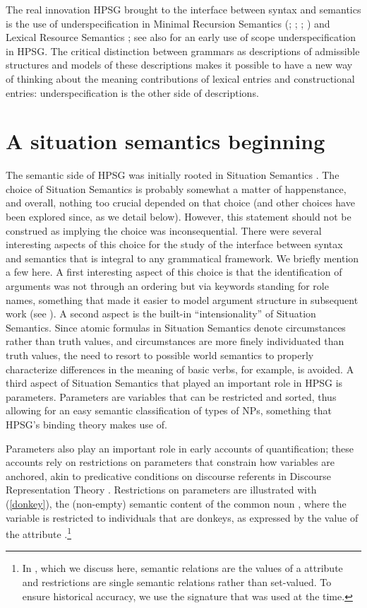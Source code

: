 \documentclass[output=paper
	        ,collection
	        ,collectionchapter
 	        ,biblatex
                ,babelshorthands
                ,newtxmath
                ,draftmode
                ,colorlinks, citecolor=brown
]{langscibook}
\begin{document}
The real innovation HPSG brought to the interface between syntax and semantics is the use of underspecification in Minimal Recursion Semantics (\citealt*{Copestakeetal1995}; \citealt{Egg1998}; \citealt*{Copestakeetal2001}; \citealt*{Copestakeetal2005}) and Lexical Resource Semantics \citep{RichterandSailer2001}; see also \citet{Nerbonne1993a} for an early use of scope underspecification in HPSG. The critical distinction between grammars as descriptions of admissible structures and models of these descriptions makes it possible to have a new way of thinking about the meaning contributions of lexical entries and constructional entries: underspecification is the other side of descriptions. 

\section{A situation semantics beginning}

The semantic side of HPSG was initially rooted in Situation Semantics \citep[Chapter 4]{PollardandSag1987}. The choice of Situation Semantics is probably somewhat a matter of happenstance, and overall, nothing too crucial depended on that choice (and other choices have been explored since, as we detail below). However, this statement should not be construed as implying the choice was inconsequential. There were several interesting aspects of this choice for the study of the interface between syntax and semantics that is integral to any grammatical framework. We briefly mention a few here. A first interesting aspect of this choice is that the identification of arguments was not through an ordering but via keywords standing for role names, something that made it easier to model argument structure in subsequent work (see ). A second aspect is the built-in ``intensionality'' of Situation Semantics. Since atomic formulas in Situation Semantics denote circumstances rather than truth values, and circumstances are more finely individuated than truth values, the need to resort to possible world semantics to properly characterize differences in the meaning of basic verbs, for example, is avoided. A third aspect of Situation Semantics that played an important role in HPSG is parameters. Parameters are variables that can be restricted and sorted, thus allowing for an easy semantic classification of types of NPs, something that HPSG's binding theory makes use of.

Parameters also play an important role in early accounts of quantification; these accounts rely on restrictions on parameters that constrain how variables are anchored, akin to predicative conditions on discourse referents in Discourse Representation Theory \citep{KampandReyle1993}. Restrictions on parameters are illustrated with (\ref{donkey}), the (non-empty) semantic content of the common noun , where the variable  is restricted to individuals that are donkeys, as expressed by the value of the attribute .\footnote{In \citet{PollardandSag1987}, which we discuss here, semantic relations are the values of a  attribute and restrictions are single semantic relations rather than set-valued. To ensure historical accuracy, we use the signature that was used at the time.}
\end{document}
